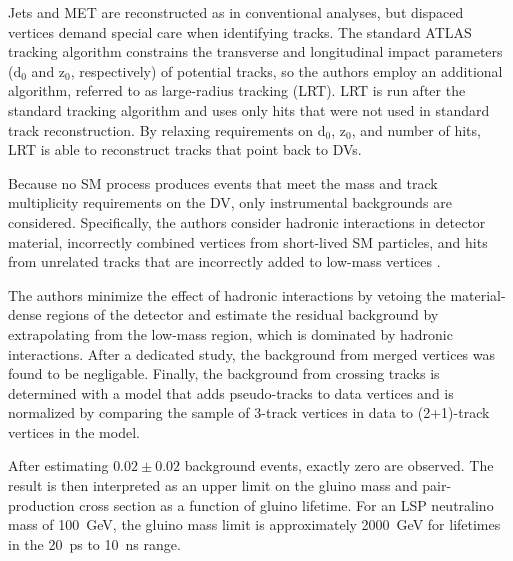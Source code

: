 \documentclass[12pt]{article}
\begin{document}
    Jets and MET are reconstructed as in conventional analyses, but dispaced vertices demand special care when identifying tracks. The standard ATLAS tracking algorithm constrains the transverse and longitudinal impact parameters ($\mathrm{d}_0$ and $\mathrm{z}_0$, respectively) of potential tracks, so the authors employ an additional algorithm, referred to as large-radius tracking (LRT). LRT is run after the standard tracking algorithm and uses only hits that were not used in standard track reconstruction. By relaxing requirements on $\mathrm{d}_0$, $\mathrm{z}_0$, and number of hits, LRT is able to reconstruct tracks that point back to DVs.
    
    Because no SM process produces events that meet the mass and track multiplicity requirements on the DV, only instrumental backgrounds are considered. Specifically, the authors consider hadronic interactions in detector material, incorrectly combined vertices from short-lived SM particles, and hits from unrelated tracks that are incorrectly added to low-mass vertices .

    The authors minimize the effect of hadronic interactions by vetoing the material-dense regions of the detector and estimate the residual background by extrapolating from the low-mass region, which is dominated by hadronic interactions. After a dedicated study, the background from merged vertices was found to be negligable. Finally, the background from crossing tracks is determined with a model that adds pseudo-tracks to data vertices and is normalized by comparing the sample of 3-track vertices in data to (2+1)-track vertices in the model.

    After estimating $\num{0.02} \pm \num{0.02}$ background events, exactly zero are observed. The result is then interpreted as an upper limit on the gluino mass and pair-production cross section as a function of gluino lifetime. For an LSP neutralino mass of \SI{100}{\giga\electronvolt}, the gluino mass limit is approximately \SI{2000}{\giga\electronvolt} for lifetimes in the \SI{20}{\pico\s} to \SI{10}{\nano\s} range. 
\end{document}

